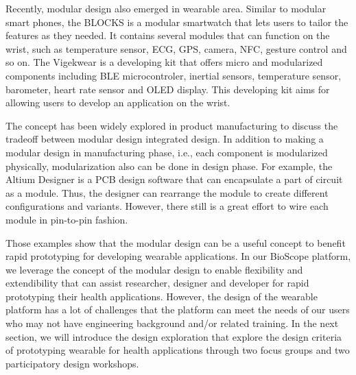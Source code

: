 Recently, modular design also emerged in wearable area.
Similar to modular smart phones, the BLOCKS \cite{BLOCKS} is a modular smartwatch that lets users to tailor the features as they needed. It contains several modules that can function on the wrist, such as temperature sensor, ECG, GPS, camera, NFC, gesture control and so on. 
The Vigekwear \cite{Vigekwear} is a developing kit that offers micro and modularized components including BLE microcontroler, inertial sensors, temperature sensor, barometer, heart rate sensor and OLED display.
This developing kit aims for allowing users to develop an application on the wrist.

The concept has been widely explored in product manufacturing to discuss the tradeoff between modular design integrated design\cite{schilling2000toward, ulrich1995role}. 
In addition to making a modular design in manufacturing phase, i.e., each component is modularized physically, modularization also can be done in design phase. For example, the Altium Designer \cite{AltiumDesigner} is a PCB design software that can encapsulate a part of circuit as a module. Thus, the designer can rearrange the module to create different configurations and variants. However, there still is a great effort to wire each module in pin-to-pin fashion.

Those examples show that the modular design can be a useful concept to benefit rapid prototyping for developing wearable applications. 
In our BioScope platform, we leverage the concept of the modular design to enable flexibility and extendibility that can assist researcher, designer and developer for rapid prototyping their health applications. However, the design of the wearable platform has a lot of challenges that the platform can meet the needs of our users who may not have engineering background and/or related training. In the next section, we will introduce the design exploration that explore the design criteria of prototyping wearable for health applications through two focus groups and two participatory design workshops.

\let\cleardoublepage\clearpage